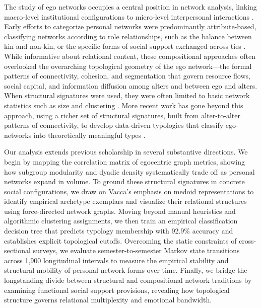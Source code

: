 \documentclass[12pt]{article}
\begin{document}
The study of ego networks occupies a central position in network analysis, linking macro-level institutional configurations to micro-level interpersonal interactions \citep{smith2020introduction, perry2018egocentric}. Early efforts to categorize personal networks were predominantly attribute-based, classifying networks according to role relationships, such as the balance between kin and non-kin, or the specific forms of social support exchanged across ties \citep{antonucci2013convoy, offer2018does}. While informative about relational content, these compositional approaches often overlooked the overarching topological geometry of the ego network---the formal patterns of connectivity, cohesion, and segmentation that govern resource flows, social capital, and information diffusion among alters and between ego and alters. When structural signatures were used, they were often limited to basic network statistics such as size and clustering \citep{burt1992structural, marsden1987core}. More recent work has gone beyond this approach, using a richer set of structural signatures, built from alter-to-alter patterns of connectivity, to develop data-driven typologies that classify ego-networks into theoretically meaningful types \citep{bidart2018personal, giannella2016inductive, vacca2020structure}.

Our analysis extends previous scholarship in several substantive directions. We begin by mapping the correlation matrix of egocentric graph metrics, showing how subgroup modularity and dyadic density systematically trade off as personal networks expand in volume. To ground these structural signatures in concrete social configurations, we draw on Vacca's \citeyearpar{vacca2020structure} emphasis on medoid representations to identify empirical archetype exemplars and visualize their relational structures using force-directed network graphs. Moving beyond manual heuristics and algorithmic clustering assignments, we then train an empirical classification decision tree that predicts typology membership with 92.9\% accuracy and establishes explicit topological cutoffs. Overcoming the static constraints of cross-sectional surveys, we evaluate semester-to-semester Markov state transitions across 1,900 longitudinal intervals to measure the empirical stability and structural mobility of personal network forms over time. Finally, we bridge the longstanding divide between structural and compositional network traditions by examining functional social support provisions, revealing how topological structure governs relational multiplexity and emotional bandwidth.
\end{document}
